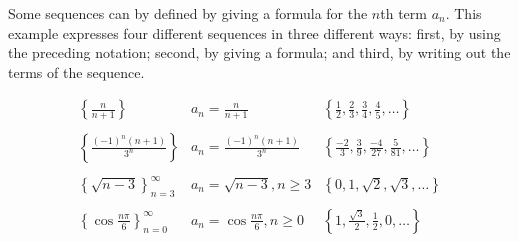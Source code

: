 \begin{frame}
Some sequences can by defined by giving a formula for the $n$th term $a_n$.  This example expresses four different sequences in three different ways: first, by using the preceding notation; second, by giving a formula; and third, by writing out the terms of the sequence.
\begin{example}
\[
\begin{array}{lll}
\left\{ \frac{n}{n+1}\right\} &%
a_n = \frac{n}{n+1} &%
\left\{ \frac{1}{2}, \frac{2}{3}, \frac{3}{4}, \frac{4}{5}, \ldots \right\}\\%
&&\\%
\left\{ \frac{(-1)^n(n+1)}{3^n}\right\} &%
a_n = \frac{(-1)^n(n+1)}{3^n} &%
\left\{ \frac{-2}{3}, \frac{3}{9}, \frac{-4}{27}, \frac{5}{81}, \ldots \right\}\\%
&&\\%
\left\{ \sqrt{n-3}\right\}_{n=3}^\infty &%
a_n = \sqrt{n-3}, n\geq 3&%
\left\{ 0, 1, \sqrt{2}, \sqrt{3}, \ldots \right\}\\%
&&\\%
\left\{ \cos \frac{n\pi}{6}\right\}_{n=0}^\infty &%
a_n = \cos \frac{n\pi}{6}, n\geq 0&%
\left\{ 1, \frac{\sqrt{3}}{2}, \frac{1}{2}, 0, \ldots \right\}\\%
\end{array}
\]
\end{example}
\end{frame}
